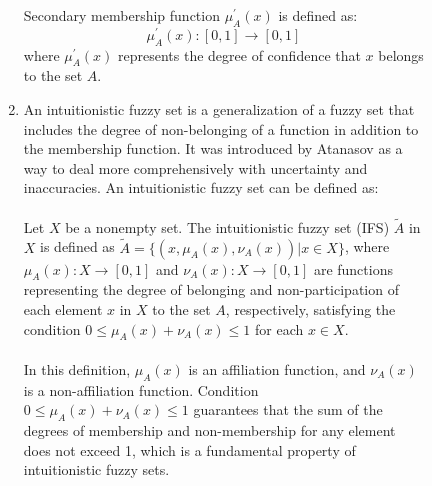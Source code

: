 \documentclass{article}
\begin{document}
\begin{figure}[!t]
\begin{minipage}{0.49\textwidth}
\begin{enumerate}
                Secondary membership function \(\mu_{A}^{'}(x)\) is defined as:\\
                \[\mu_{A}^{'}(x) : [0,1] \rightarrow [0,1]\]
                where \(\mu_{A}^{'}(x)\) represents the degree of confidence that \(x\) belongs to the set \(A\).
                \item An intuitionistic fuzzy set is a generalization of a fuzzy set that includes the degree of non-belonging of a function in addition to the membership function. It was introduced by Atanasov as a way to deal more comprehensively with uncertainty and inaccuracies. An intuitionistic fuzzy set can be defined as:\\
                ~\\
                Let $X$ be a nonempty set. The intuitionistic fuzzy set (IFS) $\tilde{A}$ in $X$ is defined as $\tilde{A} = \{(x,\mu_A(x), \nu_A(x)) | x \in X\}$, where $\mu_A(x): X\rightarrow [0,1]$ and $\nu_A(x): X\rightarrow [0,1]$ are functions representing the degree of belonging and non-participation of each element $x$ in $X$ to the set $A$, respectively, satisfying the condition $0\leq\mu_A(x) + \nu_A(x) \leq 1$ for each $x\in X$.\\
                ~\\
                In this definition, $\mu_A(x)$ is an affiliation function, and $\nu_A(x)$ is a non-affiliation function. Condition $0 \leq \mu_A(x) + \nu_A(x)\leq 1$ guarantees that the sum of the degrees of membership and non-membership for any element does not exceed 1, which is a fundamental property of intuitionistic fuzzy sets.\\
            \end{enumerate}
            ~\\
            ~\\
            ~\\
            ~\\
            ~\\
            ~\\
            ~\\
            ~\\
            ~\\
            ~\\
            ~\\
            ~\\
            ~\\
            ~\\
            ~\\

\end{minipage}
\end{figure}
\end{document}
